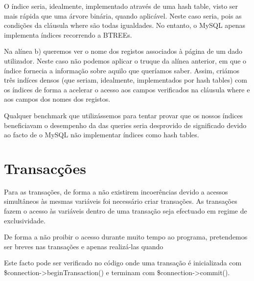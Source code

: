 \documentclass[11pt,a4paper]{article}
\begin{document}
 O índice seria, idealmente, implementado através de uma hash table, visto ser mais rápida que uma árvore binária, quando aplicável. Neste caso seria, pois as condições da cláusula where são todas igualdades. No entanto, o MySQL apenas implementa índices recorrendo a BTREEs.
 
Na alínea b) queremos ver o nome dos registos associados à página de um dado utilizador. Neste caso não podemos
aplicar o truque da alínea anterior, em que o índice fornecia a informação sobre aquilo que queríamos saber. Assim,
criámos três indíces densos (que seriam, idealmente, implementados por hash tables) com os índices de forma a
acelerar o acesso aos campos verificados na cláusula where e aos campos dos nomes dos registos.

Qualquer benchmark que utilizássemos para tentar provar que os nossos índices beneficiavam o desempenho da
das queries seria desprovido de significado devido ao facto de o MySQL não implementar índices como hash tables.

\newpage

\section{Transacções}
Para as transações, de forma a não existirem incoerências devido a acessos simultâneos às mesmas variáveis foi necessário criar transações. As transações fazem o acesso às variáveis dentro de uma transação seja efectuado em regime de exclusividade.

De forma a não proibir o acesso durante muito tempo ao programa, pretendemos ser breves nas transações e apenas realizá-las quando 

Este facto pode ser verificado no código onde uma transação é inicializada com \$connection->beginTransaction() e terminam com \$connection->commit().
\end{document}
